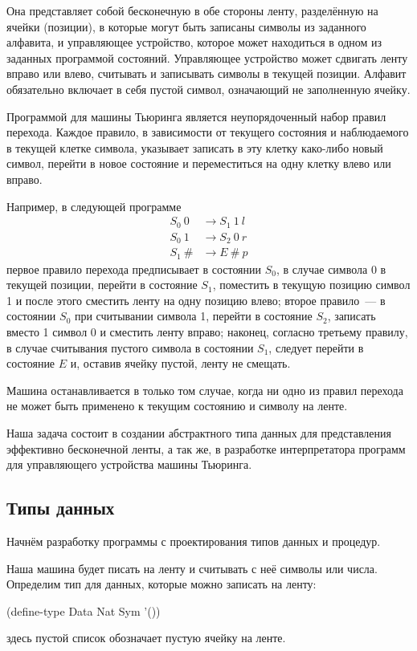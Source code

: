 Она представляет собой бесконечную в обе стороны ленту, разделённую на ячейки (позиции), в которые могут быть записаны символы из заданного алфавита, и управляющее устройство, которое может находиться в одном из заданных программой состояний. Управляющее устройство может сдвигать ленту вправо или влево, считывать и записывать символы в текущей позиции. Алфавит обязательно включает в себя пустой символ, означающий не заполненную ячейку.

Программой для машины Тьюринга является неупорядоченный набор правил перехода. Каждое правило, в зависимости от текущего состояния и наблюдаемого в текущей клетке символа, указывает записать в эту клетку како-либо новый символ, перейти в новое состояние и переместиться на одну клетку влево или вправо. 

Например, в следующей программе
\label{TM-prog}
\begin{align*}
S_0~0 &\to S_1~1~l\\
S_0~1 &\to S_2~0~r\\
S_1~\# &\to E~\#~p
\end{align*}
первое правило перехода предписывает в состоянии $S_0$, в случае символа 0 в текущей позиции, перейти в состояние $S_1$, поместить в текущую позицию символ 1 и после этого сместить ленту на одну позицию влево; второе правило~--- в состоянии $S_0$ при считывании символа 1, перейти в состояние $S_2$, записать вместо 1 символ 0 и сместить ленту вправо; наконец, согласно третьему правилу, в случае считывания пустого символа в состоянии $S_1$, следует перейти в состояние $E$ и, оставив ячейку пустой, ленту не смещать.

Машина останавливается в только том случае, когда ни одно из правил перехода не может быть применено к текущим состоянию и символу на ленте.

Наша задача состоит в создании абстрактного типа данных для представления эффективно бесконечной ленты, а так же, в разработке интерпретатора программ для управляющего устройства машины Тьюринга.

\subsection*{Типы данных}

Начнём разработку программы с проектирования типов данных и процедур.

Наша машина будет писать на ленту и считывать с неё символы или числа. Определим тип для данных, которые можно записать на ленту:
\begin{SchemeCode}
(define-type Data  Nat Sym '())
\end{SchemeCode}
\noindent здесь пустой список обозначает пустую ячейку на ленте.

